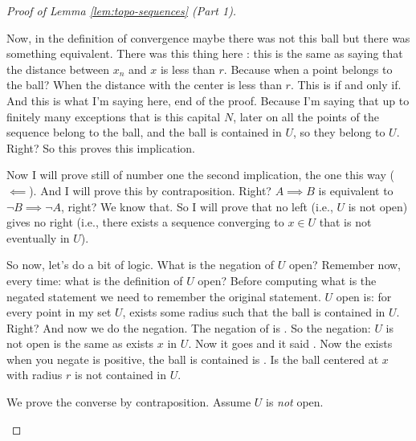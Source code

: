 \begin{proof}[Proof of Lemma \ref{lem:topo-sequences} (Part 1)]
\begin{spoken-clean}[00:17:15 - 00:18:51]
Now, in the definition of convergence maybe there was not this ball but there was something equivalent. There was this thing here : this is the same as saying that the distance between $x_n$ and $x$ is less than $r$. Because when a point belongs to the ball? When the distance with the center is less than $r$. This is if and only if. And this is what I'm saying here, end of the proof. Because I'm saying that up to finitely many exceptions that is this capital $N$, later on all the points of the sequence belong to the ball, and the ball is contained in $U$, so they belong to $U$. Right? So this proves this implication.
\end{spoken-clean}

\begin{spoken-clean}[00:18:51 - 00:21:15]
Now I will prove still of number one the second implication, the one this way ($\impliedby$). And I will prove this by contraposition. Right? $A \implies B$ is equivalent to $\neg B \implies \neg A$, right? We know that. So I will prove that no left (i.e., $U$ is not open) gives no right (i.e., there exists a sequence converging to $x \in U$ that is not eventually in $U$).

So now, let's do a bit of logic. What is the negation of $U$ open? Remember now, every time: what is the definition of $U$ open? Before computing what is the negated statement we need to remember the original statement. $U$ open is: for every point in my set $U$, exists some radius such that the ball is contained in $U$. Right? And now we do the negation. The negation of  is . So the negation: $U$ is not open is the same as exists $x$ in $U$. Now it goes and it said . Now the exists when you negate is  positive, the ball is contained is . Is the ball centered at $x$ with radius $r$ is not contained in $U$.
\end{spoken-clean}

\begin{math-stroke}[Implication \texorpdfstring{$\impliedby$}{<=} via Contraposition]
\begin{ai-proof-skeleton-invisible-content}
\end{ai-proof-skeleton-invisible-content}
We prove the converse by contraposition. Assume $U$ is \emph{not} open.


\end{math-stroke}
\end{proof}
